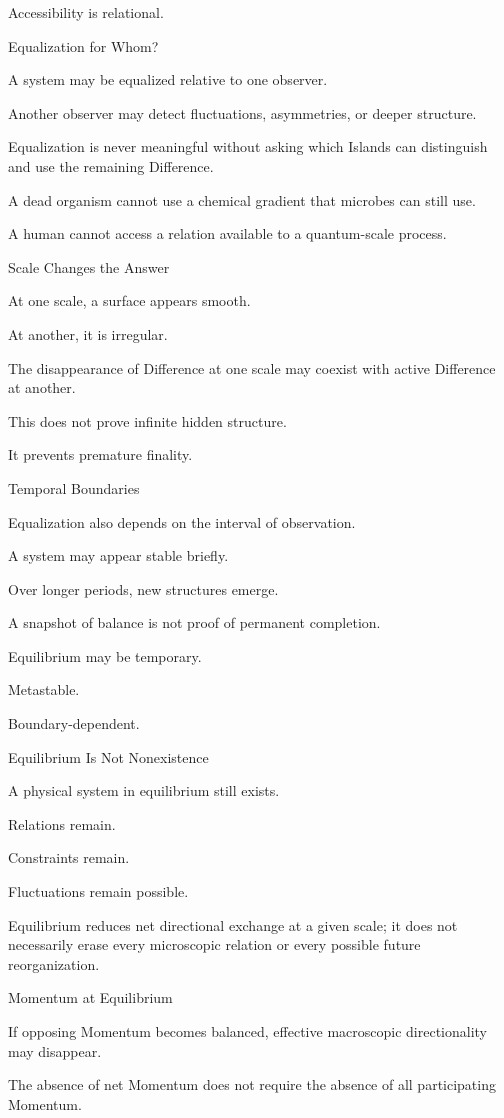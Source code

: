 Accessibility is relational.

Equalization for Whom?

A system may be equalized relative to one observer.

Another observer may detect fluctuations, asymmetries, or deeper structure.

Equalization is never meaningful without asking which Islands can distinguish and use the remaining Difference.

A dead organism cannot use a chemical gradient that microbes can still use.

A human cannot access a relation available to a quantum-scale process.

Scale Changes the Answer

At one scale, a surface appears smooth.

At another, it is irregular.

The disappearance of Difference at one scale may coexist with active Difference at another.

This does not prove infinite hidden structure.

It prevents premature finality.

Temporal Boundaries

Equalization also depends on the interval of observation.

A system may appear stable briefly.

Over longer periods, new structures emerge.

A snapshot of balance is not proof of permanent completion.

Equilibrium may be temporary.

Metastable.

Boundary-dependent.

Equilibrium Is Not Nonexistence

A physical system in equilibrium still exists.

Relations remain.

Constraints remain.

Fluctuations remain possible.

Equilibrium reduces net directional exchange at a given scale; it does not necessarily erase every microscopic relation or every possible future reorganization.

Momentum at Equilibrium

If opposing Momentum becomes balanced, effective macroscopic directionality may disappear.

The absence of net Momentum does not require the absence of all participating Momentum.

